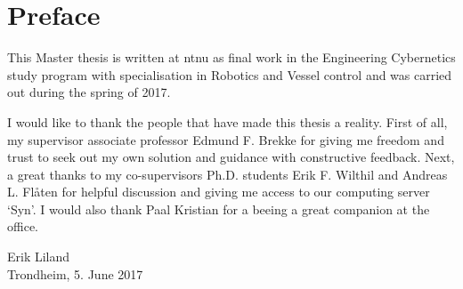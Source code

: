 
\section*{\huge Preface}
\hfill
\noindent 

This Master thesis is written at \gls{ntnu} as final work in the Engineering Cybernetics study program with specialisation in Robotics and Vessel control and was carried out during the spring of 2017.

I would like to thank the people that have made this thesis a reality. First of all, my supervisor associate professor Edmund F. Brekke for giving me freedom and trust to seek out my own solution and guidance with constructive feedback. Next, a great thanks to my co-supervisors Ph.D. students Erik F. Wilthil and Andreas L. Flåten for helpful discussion and giving me access to our computing server `Syn'. I would also thank Paal Kristian for a beeing a great companion at the office.
\vspace{2 cm} 
\begin{center}
Erik Liland \\
Trondheim, 5. June 2017
\end{center}
